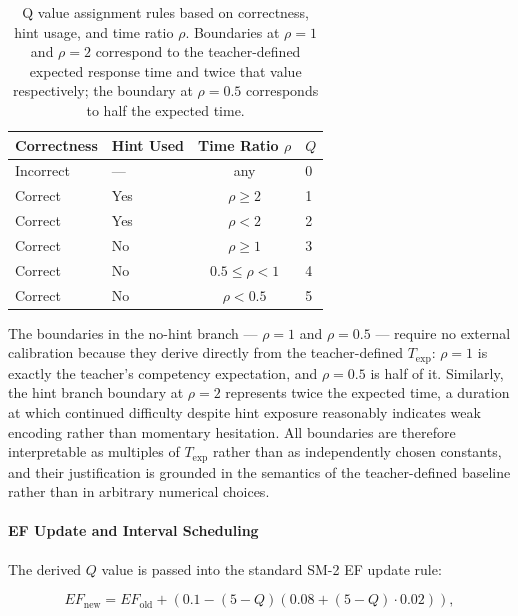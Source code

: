 \begin{table}[H]
\centering
\small
\renewcommand{\arraystretch}{1.3}
\caption{Q value assignment rules based on correctness, hint usage, and time ratio $\rho$. Boundaries at $\rho = 1$ and $\rho = 2$ correspond to the teacher-defined expected response time and twice that value respectively; the boundary at $\rho = 0.5$ corresponds to half the expected time.}
\begin{tabular}{|l|l|c|l|}
\hline
\textbf{Correctness} & \textbf{Hint Used} & 
\textbf{Time Ratio $\rho$} & \textbf{$Q$} \\
\hline
Incorrect & — & any & 0 \\
\hline
Correct & Yes & $\rho \geq 2$ & 1 \\
Correct & Yes & $\rho < 2$    & 2 \\
\hline
Correct & No  & $\rho \geq 1$ & 3 \\
Correct & No  & $0.5 \leq \rho < 1$ & 4 \\
Correct & No  & $\rho < 0.5$  & 5 \\
\hline
\end{tabular}
\label{tab:q_assignment}
\end{table}

The boundaries in the no-hint branch — $\rho = 1$ and $\rho = 0.5$ — require no external calibration because they derive directly from the teacher-defined $T_{\text{exp}}$: $\rho = 1$ is exactly the teacher's competency expectation, and $\rho = 0.5$ is half of it. Similarly, the hint branch boundary at $\rho = 2$ represents twice the expected time, a duration at which continued difficulty despite hint exposure reasonably indicates weak encoding rather than momentary hesitation. All boundaries are therefore interpretable as multiples of $T_{\text{exp}}$ rather than as independently chosen constants, and their justification is grounded in the semantics of the teacher-defined baseline rather than in arbitrary numerical choices.

\paragraph{EF Update and Interval Scheduling}
The derived $Q$ value is passed into the standard SM-2 EF 
update rule:

\begin{equation}
EF_{\text{new}} = EF_{\text{old}} + 
\left(0.1 - (5 - Q)\left(0.08 + (5 - Q) \cdot 
0.02\right)\right),
\end{equation}

